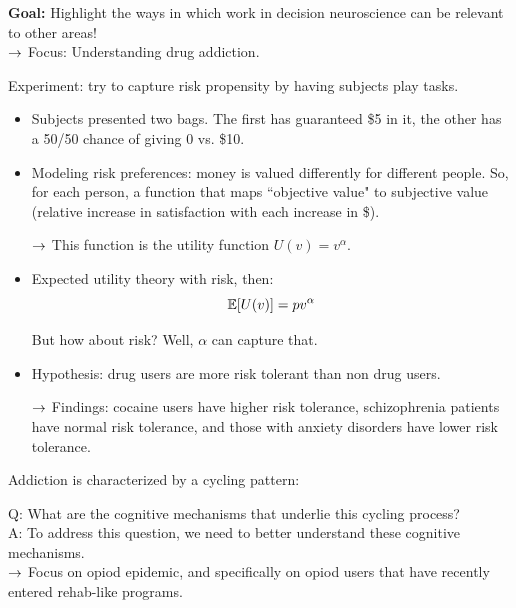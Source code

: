 {\bf Goal:} Highlight the ways in which work in decision neuroscience can be relevant to other areas! \\

$\rightarrow$ Focus: Understanding drug addiction. \\


Experiment: try to capture risk propensity by having subjects play tasks.
\begin{itemize}
    \item Subjects presented two bags. The first has guaranteed \$5 in it, the other has a 50/50 chance of giving 0 vs. \$10.
    \item Modeling risk preferences: money is valued differently for different people. So, for each person, a function that maps ``objective value" to subjective value (relative increase in satisfaction with each increase in \$).
    
    $\rightarrow$ This function is the utility function $U(v) = v^{\alpha}$.
    
    \item Expected utility theory with risk, then:
    \[
    \mathbb{E}[U(v)] = pv^{\alpha}
    \]
    
    But how about risk? Well, $\alpha$ can capture that.
    
    \item Hypothesis: drug users are more risk tolerant than non drug users.

    $\rightarrow$ Findings: cocaine users have higher risk tolerance, schizophrenia patients have normal risk tolerance, and those with anxiety disorders have lower risk tolerance.
\end{itemize}

Addiction is characterized by a cycling pattern:

Q: What are the cognitive mechanisms that underlie this cycling process? \\

A: To address this question, we need to better understand these cognitive mechanisms. \\

$\rightarrow$ Focus on opiod epidemic, and specifically on opiod users that have recently entered rehab-like programs. \\

